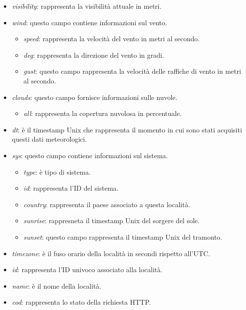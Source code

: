 \begin{itemize}
    \item \textit{visibility}: rappresenta la visibilità attuale in metri.
    \item \textit{wind}: questo campo contiene informazioni sul vento.
    \begin{itemize}
        \item \textit{speed}: rappresenta la velocità del vento in metri al secondo.
        \item \textit{deg}: rappresenta la direzione del vento in gradi.
        \item \textit{gust}: questo campo rappresenta la velocità delle raffiche di vento in metri al secondo.
    \end{itemize}
    
    \item \textit{clouds}: questo campo fornisce informazioni sulle nuvole.
    \begin{itemize}
        \item \textit{all}: rappresenta la copertura nuvolosa in percentuale.
    \end{itemize}
        
    \item \textit{dt}: è il timestamp Unix che rappresenta il momento in cui sono stati acquisiti questi dati meteorologici.
    \item \textit{sys}: questo campo contiene informazioni sul sistema.
    \begin{itemize}
        \item \textit{type}: è tipo di sistema.
        \item \textit{id}: rappresenta l'ID del sistema.
        \item \textit{country}: rappresenta il paese associato a questa località.
        \item \textit{sunrise}: rappresneta il timestamp Unix del sorgere del sole.
        \item \textit{sunset}: questo campo rappresenta il timestamp Unix del tramonto.
    \end{itemize}
        
    \item \textit{timezone}: è il fuso orario della località in secondi rispetto all'UTC. 
    \item \textit{id}: rappresenta l'ID univoco associato alla località.
    \item \textit{name}: è il nome della località.
    \item \textit{cod}: rappresenta lo stato della richiesta HTTP.
\end{itemize}

